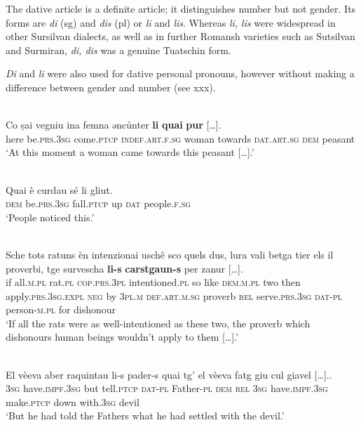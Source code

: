 The dative article is a definite article; it distinguishes number but not gender. Its forms are \textit{di} (sg) and \textit{dis} (pl) or \textit{li} and \textit{lis}.  Whereas \textit{li, lis} were widespread in other Sursilvan dialects, as well as in further  Romansh varieties such as Sutsilvan and Surmiran,  \textit{di, dis} was a genuine Tuatschin form.

\textit{Di} and \textit{li} were also used for dative personal pronouns, however without making a difference between gender and number (see xxx).

\ea\label{}
 {\citealt[64]{Büchli1966}}\\
\gll  Co ṣai	vegniu	ina	femna əncůnter \textbf{li} \textbf{quai}   \textbf{pur} […].\\
     here	be.\textsc{prs}.3\textsc{sg}  come.\textsc{ptcp}	\textsc{indef}.\textsc{art}.\textsc{f}.\textsc{sg} woman	towards	\textsc{dat}.\textsc{art}.\textsc{sg} \textsc{dem} peasant\\
\glt `At this moment a woman came towards this peasant […].'
\z


\ea\label{}
 {\citealt[12]{Büchli1966}}\\
\gll  Quai è curdau sé li gliut.\\
     \textsc{dem} be.\textsc{prs.3sg} fall.\textsc{ptcp} up \textsc{dat} people.\textsc{f.sg}\\
\glt `People noticed this.'
\z

\ea\label{}
\\
\gll  Sche tots ratuns èn intenzionai uschê sco quels dus, lura vali betga tier els il proverbi, tge survescha \textbf{li-s} \textbf{carstgaun-s} per zanur […].\\
     if all.\textsc{m.pl} rat.\textsc{pl} \textsc{cop.prs.3pl} intentioned.\textsc{pl} so like \textsc{dem.m.pl} two then apply.\textsc{prs.3sg.expl}  \textsc{neg}  by \textsc{3pl.m}  \textsc{def.art.m.sg} proverb \textsc{rel}  serve.\textsc{prs.3sg}  \textsc{dat}-\textsc{pl}  person-\textsc{m.pl} for dishonour\\
\glt `If all the rats were as well-intentioned as these two, the proverb which dishonours human beings wouldn’t apply to them […].'
\z

\ea\label{}
 {\citealt[147]{Büchli1966}}\\
\gll El vèeva aber raquintau li-s pader-s quai tg’ el vèeva fatg giu cul giavel […]..\\
     \textsc{3sg} have.\textsc{impf.3sg} but tell.\textsc{ptcp} \textsc{dat-pl} Father-\textsc{pl} \textsc{dem} \textsc{rel} \textsc{3sg} have.\textsc{impf.3sg} make.\textsc{ptcp}  down with.\textsc{3sg} devil\\
\glt `But he had told the Fathers what he had settled with the devil.'%
\z

